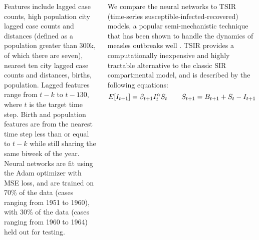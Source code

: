 \documentclass[20pt,margin=1in,innermargin=0in,blockverticalspace=-0.3in]{tikzposter}
\begin{document}
\begin{columns}
{        Features include lagged case counts, high population city lagged case counts and distances (defined as a population greater than 300k, of which there are seven), nearest ten city lagged case counts and distances, births, population. 
        Lagged features range from $t - k$ to $t - 130$, where $t$ is the target time step. 
        Birth and population features are from the nearest time step less than or equal to $t - k$ while still sharing the same biweek of the year. 
        Neural networks are fit using the Adam optimizer with MSE loss, and are trained on 70\% of the data (cases ranging from 1951 to 1960), with 30\% of the data (cases ranging from 1960 to 1964) held out for testing.

        We compare the neural networks to TSIR (time-series susceptible-infected-recovered) models, a popular semi-mechanistic technique that has been shown to handle the dynamics of measles outbreaks well \cite{finkenstadt2000time}.
        TSIR provides a computationally inexpensive and highly tractable alternative to the classic SIR compartmental model, and is described by the following equations:
        \[
            E[I_{t+1}] = \beta_{t + 1} I_t^\alpha S_t \quad \quad
            S_{t+1} = B_{t + 1} + S_t - I_{t+1} \\
        \]
        \vspace{1em}
    }


\end{columns}
\end{document}
